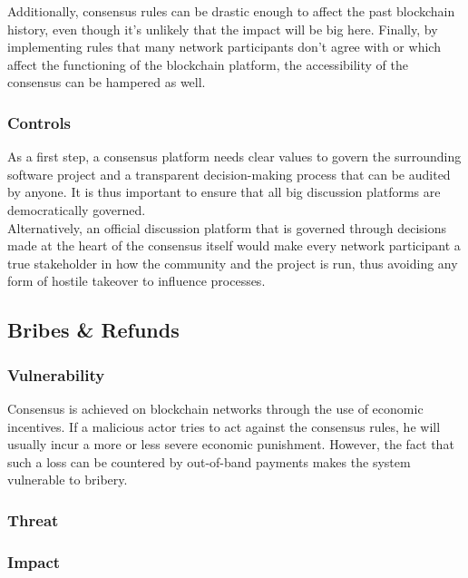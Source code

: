 \documentclass[11pt,a4paper,draft]{article}
\begin{document}
Additionally, consensus rules can be drastic enough to affect the past blockchain history, even though it's unlikely that the impact will be big here. Finally, by implementing rules that many network participants don't agree with or which affect the functioning of the blockchain platform, the accessibility of the consensus can be hampered as well.\\

\subsubsection{Controls}

As a first step, a consensus platform needs clear values to govern the surrounding software project and a transparent decision-making process that can be audited by anyone. It is thus important to ensure that all big discussion platforms are democratically governed.\\

Alternatively, an official discussion platform that is governed through decisions made at the heart of the consensus itself would make every network participant a true stakeholder in how the community and the project is run, thus avoiding any form of hostile takeover to influence processes.\\

\subsection{Bribes \& Refunds}

\subsubsection{Vulnerability}

Consensus is achieved on blockchain networks through the use of economic incentives. If a malicious actor tries to act against the consensus rules, he will usually incur a more or less severe economic punishment. However, the fact that such a loss can be countered by out-of-band payments makes the system vulnerable to bribery.\\

\subsubsection{Threat}

\subsubsection{Impact}
\end{document}
